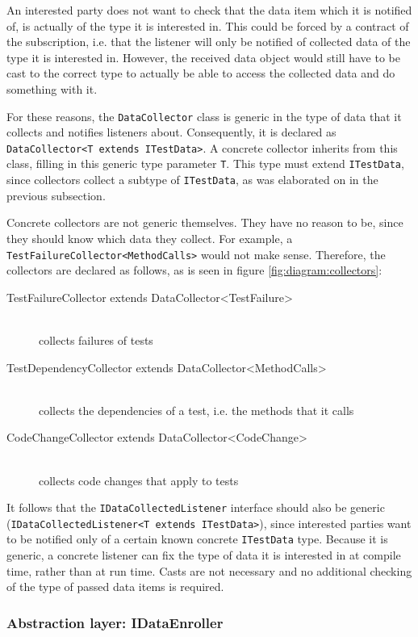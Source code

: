 \documentclass[i2]{oss}
\newcommand{\class}[1]{\texttt{#1}}
\begin{document}
An interested party does not want to check that the data item which it is notified of, is actually of the type it is interested in.
This could be forced by a contract of the subscription, i.e. that the listener will only be notified of collected data of the type it is interested in.
However, the received data object would still have to be cast to the correct type to actually be able to access the collected data and do something with it.

For these reasons, the \class{DataCollector} class is generic in the type of data that it collects and notifies listeners about.
Consequently, it is declared as \class{DataCollector<T extends ITestData>}.
A concrete collector inherits from this class, filling in this generic type parameter \class{T}.
This type must extend \class{ITestData}, since collectors collect a subtype of \class{ITestData}, as was elaborated on in the previous subsection. %

Concrete collectors are not generic themselves.
They have no reason to be, since they should know which data they collect.
For example, a \class{TestFailureCollector<MethodCalls>} would not make sense.
Therefore, the collectors are declared as follows, as is seen in figure \ref{fig:diagram:collectors}:
\begin{description}
\item[TestFailureCollector extends DataCollector<TestFailure>] \hfill \\ collects failures of tests
\item[TestDependencyCollector extends DataCollector<MethodCalls>] \hfill \\ collects the dependencies of a test, i.e. the methods that it calls
\item[CodeChangeCollector extends DataCollector<CodeChange>] \hfill \\ collects code changes that apply to tests
\end{description}

It follows that the \class{IDataCollectedListener} interface should also be generic (\class{IDataCollectedListener<T extends ITestData>}), since interested parties want to be notified only of a certain known concrete \class{ITestData} type.
Because it is generic, a concrete listener can fix the type of data it is interested in at compile time, rather than at run time. Casts are not necessary and no additional checking of the type of passed data items is required.

\subsubsection{Abstraction layer: IDataEnroller}
\end{document}
